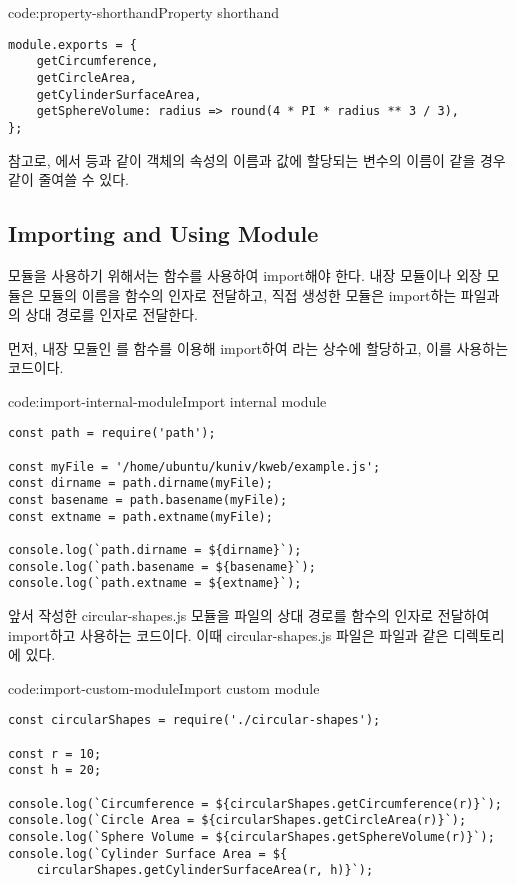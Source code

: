 \begin{code}{code:property-shorthand}{Property shorthand}
\begin{verbatim}
module.exports = {
    getCircumference,
    getCircleArea,
    getCylinderSurfaceArea,
    getSphereVolume: radius => round(4 * PI * radius ** 3 / 3),
};
\end{verbatim}
\end{code}

참고로, 에서  등과 같이 객체의 속성의 이름과 값에 할당되는 변수의 이름이 같을 경우 \와 같이 줄여쓸 수 있다.
\clearpage

\subsection*{Importing and Using Module}

모듈을 사용하기 위해서는  함수를 사용하여 import해야 한다. 내장 모듈이나 외장 모듈은 모듈의 이름을  함수의 인자로 전달하고, 직접 생성한 모듈은 import하는 파일과의 상대 경로를 인자로 전달한다.

먼저, \은 내장 모듈인 를  함수를 이용해 import하여 라는 상수에 할당하고, 이를 사용하는 코드이다.

\begin{code}{code:import-internal-module}{Import internal module}
\begin{verbatim}
const path = require('path');

const myFile = '/home/ubuntu/kuniv/kweb/example.js';
const dirname = path.dirname(myFile);
const basename = path.basename(myFile);
const extname = path.extname(myFile);

console.log(`path.dirname = ${dirname}`);
console.log(`path.basename = ${basename}`);
console.log(`path.extname = ${extname}`);
\end{verbatim}
\end{code}

\은 앞서 작성한 circular-shapes.js 모듈을 파일의 상대 경로를  함수의 인자로 전달하여 import하고 사용하는 코드이다. 이때 circular-shapes.js 파일은  파일과 같은 디렉토리에 있다.

\begin{code}{code:import-custom-module}{Import custom module }
\begin{verbatim}
const circularShapes = require('./circular-shapes');

const r = 10;
const h = 20;

console.log(`Circumference = ${circularShapes.getCircumference(r)}`);
console.log(`Circle Area = ${circularShapes.getCircleArea(r)}`);
console.log(`Sphere Volume = ${circularShapes.getSphereVolume(r)}`);
console.log(`Cylinder Surface Area = ${
    circularShapes.getCylinderSurfaceArea(r, h)}`);
\end{verbatim}
\end{code}

